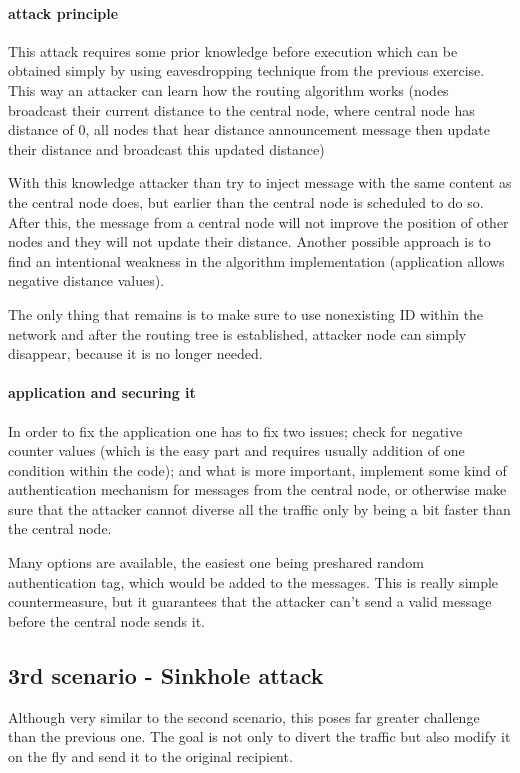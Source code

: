 \documentclass[
  print, %
  Table,   %
  nolof,     %
  nolot,     %
           oneside
]{fithesis3}
\begin{document}
    \paragraph{attack principle}
    This attack requires some prior knowledge before execution which can be obtained simply by using eavesdropping technique from the previous exercise. This way an attacker can learn how the routing algorithm works (nodes broadcast their current distance to the central node, where central node has distance of 0, all nodes that hear distance announcement message then update their distance and broadcast this updated distance)

    With this knowledge attacker than try to inject message with the same content as the central node does, but earlier than the central node is scheduled to do so. After this, the message from a central node will not improve the position of other nodes and they will not update their distance. Another possible approach is to find an intentional weakness in the algorithm implementation (application allows negative distance values).

    The only thing that remains is to make sure to use nonexisting ID within the network and after the routing tree is established, attacker node can simply disappear, because it is no longer needed.

    \paragraph{application and securing it}
    In order to fix the application one has to fix two issues; check for negative counter values (which is the easy part and requires usually addition of one condition within the code); and what is more important, implement some kind of authentication mechanism for messages from the central node, or otherwise make sure that the attacker cannot diverse all the traffic only by being a bit faster than the central node.

    Many options are available, the easiest one being preshared random authentication tag, which would be added to the messages. This is really simple countermeasure, but it guarantees that the attacker can't send a valid message before the central node sends it.

    \subsection{3rd scenario - Sinkhole attack}\label{subsec:3rd}
    Although very similar to the second scenario, this poses far greater challenge than the previous one. The goal is not only to divert the traffic but also modify it on the fly and send it to the original recipient.
\end{document}

